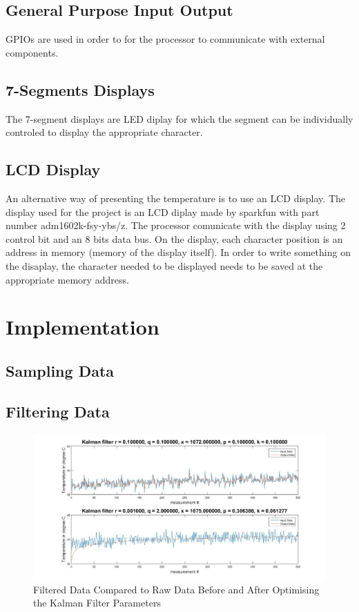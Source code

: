 \documentclass[12pt]{article}
\begin{document}
\subsection{General Purpose Input Output}
GPIOs are used in order to for the processor to communicate with external components. 

\subsection{7-Segments Displays}
The 7-segment displays are LED diplay for which the segment can be individually controled to display the appropriate character.

\subsection{LCD Display}
An alternative way of presenting the temperature is to use an LCD display. The display used for the project is an LCD diplay made by sparkfun with part number adm1602k-fsy-ybs/z. The processor comunicate with the display using 2 control bit and an 8 bits data bus. On the display, each character position is an address in memory (memory of the display itself). In order to write something on the disaplay, the character needed to be displayed needs to be saved at the appropriate memory address.


\section{Implementation}
\subsection{Sampling Data}

\subsection{Filtering Data}
\begin{figure}[!htb]
\centering
\includegraphics[scale=0.35]{images/kalmanfilter.jpg}
\caption{Filtered Data Compared to Raw Data Before and After Optimising the Kalman Filter Parameters}
\label{fig:kalmanfilter}
\end{figure}
\end{document}
